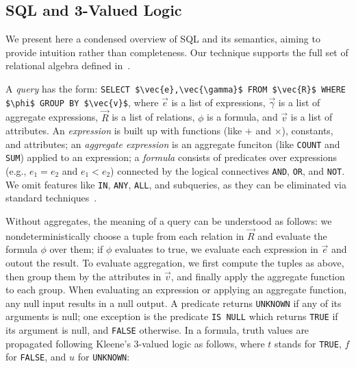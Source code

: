 \documentclass[sigconf]{acmart}
\begin{document}
\subsection{SQL and 3-Valued Logic}
We present here a condensed overview of SQL and its semantics,
 aiming to provide intuition rather than completeness.
Our technique supports the full set of relational algebra 
 defined in~\cite{DBLP:conf/pods/LibkinP23}.

A {\em query} has the form:
%
\lstinline[mathescape=true]|SELECT $\vec{e},\vec{\gamma}$ FROM $\vec{R}$ WHERE $\phi$ GROUP BY $\vec{v}$|,
%
where $\vec{e}$ is a list of expressions,
 $\vec{\gamma}$ is a list of aggregate expressions,
 $\vec{R}$ is a list of relations,
 $\phi$ is a formula,
 and $\vec{v}$ is a list of attributes.
An {\em expression} is built up with functions 
 (like $+$ and $\times$),
 constants, and attributes;
 an {\em aggregate expression} is an
 aggregate funciton 
 (like \lstinline[mathescape=true]|COUNT| 
 and \lstinline[mathescape=true]|SUM|)
 applied to an expression;
 a {\em formula} consists of predicates over expressions
 (e.g., $e_1 = e_2$ and $e_1 < e_2$) 
 connected by the logical connectives 
 \lstinline|AND|,
 \lstinline|OR|, and
 \lstinline|NOT|.
We omit features like 
 \lstinline|IN|,
 \lstinline|ANY|, 
 \lstinline|ALL|,
 and subqueries, 
 as they can be eliminated via standard techniques~\cite{DBLP:conf/pods/LibkinP23, DBLP:conf/btw/0001K15}.
 
Without aggregates, the meaning of a query can be understood
 as follows:
 we nondeterministically choose a tuple
 from each relation in $\vec{R}$ 
 and evaluate the formula $\phi$ over them;
 if $\phi$ evaluates to true,
 we evaluate each expression in $\vec{e}$ and outout the result.
To evaluate aggregation,
 we first compute the tuples as above,
 then group them by the attributes in $\vec{v}$,
 and finally apply the aggregate function to each group.
When evaluating an expression or applying an aggregate function, 
 any null input results in a null output.
A predicate returns \lstinline|UNKNOWN| if 
 any of its arguments is null;
 one exception is the predicate \lstinline|IS NULL|
 which returns \lstinline|TRUE| if its argument is null,
 and \lstinline|FALSE| otherwise.
In a formula, truth values are propagated
 following Kleene's 3-valued logic as follows, 
 where $t$ stands for \lstinline|TRUE|, 
 $f$ for \lstinline|FALSE|, and $u$ for \lstinline|UNKNOWN|:
\end{document}
